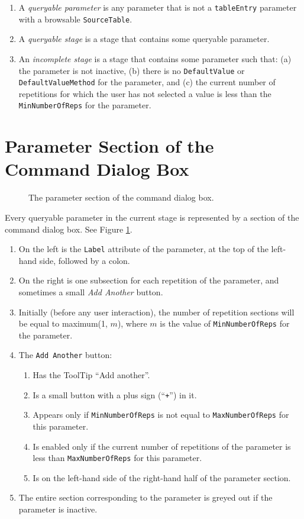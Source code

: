 \documentclass[11pt]{article}
\begin{document}
\begin{enumerate}
  {\tt ParentValue} for this parameter.
\item A {\it queryable parameter} is any parameter
  that is not a {\tt tableEntry} parameter with
  a browsable {\tt SourceTable}.
\item A {\it queryable stage} is a stage that contains some
  queryable parameter.
\item An {\it incomplete stage} is a stage that contains some parameter
  such that: (a) the parameter is not inactive, (b) there is no
  {\tt DefaultValue} or {\tt DefaultValueMethod} for the parameter,
  and (c) the current number of repetitions for which the user has not
  selected a value is less than the
  {\tt MinNumberOfReps} for the parameter.
\end{enumerate}

\section{Parameter Section of the Command Dialog Box}

\begin{figure}

\centerline{\epsfxsize=5.5in }

\caption{
  The parameter section of the command dialog box.
}
\label{parameterSectionFig}
\end{figure}

Every queryable parameter in the current stage is represented by a section
of the command dialog box.  See Figure \ref{parameterSectionFig}.
\begin{enumerate}
\item On the left is the {\tt Label} attribute of the parameter,
  at the top of the left-hand side, followed by a colon.
\item On the right is one subsection for each repetition of the parameter,
  and sometimes a small {\it Add Another} button.
\item Initially (before any user interaction), the number of repetition
  sections will be equal to maximum(1, $m$), where $m$ is the value of
 {\tt MinNumberOfReps} for the parameter.
\item The {\tt Add Another} button:
  \begin{enumerate}
  \item Has the ToolTip ``Add another''.
  \item Is a small button with a plus sign (``{\tt +}'') in it.
  \item Appears only if {\tt MinNumberOfReps} is not equal to
    {\tt MaxNumberOfReps} for this parameter.
  \item Is enabled only if the current number of repetitions of the
    parameter is less than {\tt MaxNumberOfReps} for this parameter.
  \item Is on the left-hand side of the right-hand half of the parameter
    section.
  \end{enumerate}
\item The entire section corresponding to the parameter is greyed out
  if the parameter is inactive.
\end{enumerate}
\end{document}
